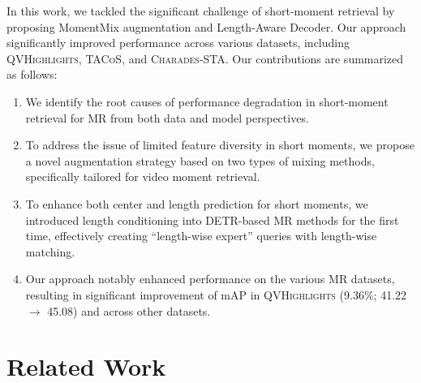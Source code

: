 In this work, we tackled the significant challenge of short-moment retrieval by proposing MomentMix augmentation and Length-Aware Decoder.
Our approach significantly improved performance across various datasets, including \textsc{QVHighlights}, \textsc{TACoS}, and \textsc{Charades-STA}.
Our contributions are summarized as follows:
\begin{enumerate}
    \item We identify the root causes of performance degradation in short-moment retrieval for MR from both data and model perspectives.
    
    \item To address the issue of limited feature diversity in short moments, we propose a novel augmentation strategy based on two types of mixing methods, specifically tailored for video moment retrieval.
    
    \item To enhance both center and length prediction for short moments, we introduced length conditioning into DETR-based MR methods for the first time, effectively creating  ``length-wise expert'' queries with length-wise matching.
    
    \item Our approach notably enhanced performance on the various MR datasets, resulting in significant improvement of mAP in \textsc{QVHighlights} (9.36\%; 41.22 $\rightarrow$ 45.08) and across other datasets.
\end{enumerate}

\section{Related Work}
\label{sec:related_work}

